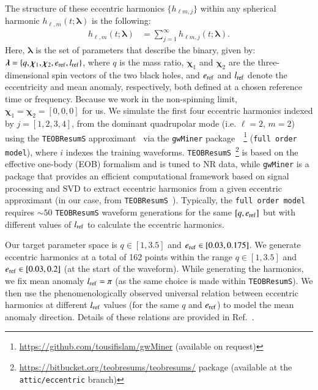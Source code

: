\documentclass[aps,prd,amsmath,floats,floatfix, twocolumn,
superscriptaddress,nofootinbib,showpacs,longbibliography]{revtex4-1}
\begin{document}
The structure of these eccentric harmonics $\{h_{\ell m, j}\}$ within any spherical harmonic $h_{\ell,m}(t; \boldsymbol\lambda)$ is the following:
\begin{align}
h_{\ell,m}(t; \boldsymbol\lambda) &= \sum_{j=1}^\infty h_{\ell m, j}(t; \boldsymbol\lambda).
\label{hmodes}
\end{align}
Here, $\boldsymbol{\lambda}$ is the set of parameters that describe the binary, given by:  $\boldsymbol{\lambda} = \{q, \boldsymbol{\chi}_1, \boldsymbol{\chi}_2, e_{\rm ref}, l_{\rm ref} \}$,  
where $q$ is the mass ratio, $\boldsymbol{\chi}_1$ and $\boldsymbol{\chi}_2$ are the three-dimensional spin vectors of the two black holes, and $e_{\rm ref}$ and $l_{\rm ref}$ denote the eccentricity and mean anomaly, respectively, both defined at a chosen reference time or frequency. Because we work in the non-spinning limit, $\boldsymbol{\chi}_1 = \boldsymbol{\chi}_2 = [0,0,0]$ for us. We simulate the first four eccentric harmonics indexed by $j = [1,2,3,4]$, from the dominant quadrupolar mode (i.e. $\ell=2$, $m=2$) using the \texttt{TEOBResumS} approximant~\cite{Chiaramello:2020ehz} via the \texttt{gwMiner} package~\cite{Islam2025InPrep}~\footnote{\href{https://github.com/tousifislam/gwMiner}{https://github.com/tousifislam/gwMiner} (available on request)} (\texttt{full order model}), where $i$ indexes the training waveforms. \texttt{TEOBResumS}~\footnote{\href{https://bitbucket.org/teobresums/teobresums}{https://bitbucket.org/teobresums/teobresums/} package (available at the \texttt{attic/eccentric} branch)} is based on the effective one-body (EOB) formalism and is tuned to NR data, while \texttt{gwMiner} is a package that provides an efficient computational framework based on signal processing and SVD to extract eccentric harmonics from a given eccentric approximant (in our case, from \texttt{TEOBResumS}~\cite{Chiaramello:2020ehz}). Typically, the \texttt{full order model} requires $\sim 50$ \texttt{TEOBResumS} waveform generations for the same $[q,e_{\rm ref}]$ but with different values of $l_{\rm ref}$ to calculate the eccentric harmonics.

Our target parameter space is $q \in [1,3.5]$ and $e_{\rm ref} \in [0.03,0.175]$. We generate eccentric harmonics at a total of 162 points within the range $q \in [1,3.5]$ and $e_{\rm ref} \in [0.03,0.2]$ (at the start of the waveform). While generating the harmonics, we fix mean anomaly $l_{\rm ref}=\pi$ (as the same choice is made within \texttt{TEOBResumS}). We then use the phenomenologically observed universal relation between eccentric harmonics at different $l_{\rm ref}$ values (for the same $q$ and $e_{\rm ref}$) to model the mean anomaly direction. Details of these relations are provided in Ref.~\cite{Islam2025InPrep}.
\end{document}
